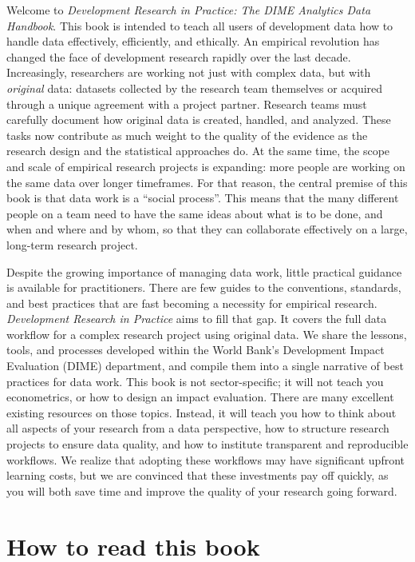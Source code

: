 \documentclass[
]{book}
\begin{document}
Welcome to \emph{Development Research in Practice: The DIME Analytics Data Handbook}. This book is intended to teach all users of development data how to handle data effectively, efficiently, and ethically. An empirical revolution has changed the face of development research rapidly over the last decade. Increasingly, researchers are working not just with complex data, but with \emph{original} data: datasets collected by the research team themselves or acquired through a unique agreement with a project partner. Research teams must carefully document how original data is created, handled, and analyzed. These tasks now contribute as much weight to the quality of the evidence as the research design and the statistical approaches do. At the same time, the scope and scale of empirical research projects is expanding: more people are working on the same data over longer timeframes. For that reason, the central premise of this book is that data work is a ``social process''. This means that the many different people on a team need to have the same ideas about what is to be done, and when and where and by whom, so that they can collaborate effectively on a large, long-term research project.

Despite the growing importance of managing data work, little practical guidance is available for practitioners. There are few guides to the conventions, standards, and best practices that are fast becoming a necessity for empirical research. \emph{Development Research in Practice} aims to fill that gap. It covers the full data workflow for a complex research project using original data. We share the lessons, tools, and processes developed within the World Bank's Development Impact Evaluation (DIME) department, and compile them into a single narrative of best practices for data work. This book is not sector-specific; it will not teach you econometrics, or how to design an impact evaluation. There are many excellent existing resources on those topics. Instead, it will teach you how to think about all aspects of your research from a data perspective, how to structure research projects to ensure data quality, and how to institute transparent and reproducible workflows. We realize that adopting these workflows may have significant upfront learning costs, but we are convinced that these investments pay off quickly, as you will both save time and improve the quality of your research going forward.

\hypertarget{how-to-read-this-book}{%
\section*{How to read this book}\label{how-to-read-this-book}}
\end{document}
